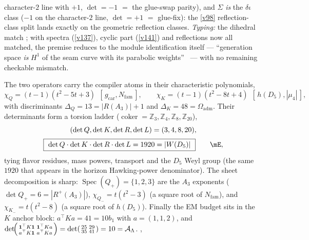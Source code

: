 \documentclass[11pt,a4paper]{article}
\newcommand{\gcar}{g_{\mathrm{car}}}
\newcommand{\Nfam}{N_{\mathrm{fam}}}
\newcommand{\Oadm}{\Omega_{\mathrm{adm}}}
\newcommand{\AL}{\mathcal A_\Lambda}
\newcommand{\Z}{\mathbb{Z}}
\theoremstyle{definition}
\begin{document}
\begin{keybox}
character-$2$ line with $+1$, $\det=-1$ $=$ the glue-swap parity), and $\Sigma$ \emph{is} the
$\delta\iota$ class ($-1$ on the character-$2$ line, $\det=+1$ $=$ glue-fix): the \vref{v98}
reflection-class split lands exactly on the geometric reflection classes. \emph{Typing:} the dihedral
match \mE; with spectra (\vref{v137}), cyclic part (\vref{v141}) and reflections now all matched, the
premise reduces to the module identification itself --- ``generation space \emph{is} $H^1$ of the seam
curve with its parabolic weights'' \mC\ --- with no remaining checkable mismatch.
\end{keybox}

\begin{winbox}
The two operators carry the compiler atoms in their characteristic polynomials,
\begin{equation}
  \chi_Q=(t-1)(t^2-5t+3)\ \ [\,\gcar,\Nfam\,],\qquad
  \chi_K=(t-1)(t^2-8t+4)\ \ [\,h(D_5),|\mu_4|\,],
\end{equation}
with discriminants $\Delta_Q=13=|R(A_3)|{+}1$ and $\Delta_K=48=\Oadm$. Their determinants form a torsion
ladder ($\operatorname{coker}=\Z_3,\Z_4,\Z_8,\Z_{20}$),
\begin{equation}
\begin{gathered}
  (\det Q,\det K,\det R,\det L)=(3,4,8,20),\\[2pt]
  \boxed{\ \det Q\cdot\det K\cdot\det R\cdot\det L=1920=|W(D_5)|\ }\qquad\mE ,
\end{gathered}
\end{equation}
tying flavor residues, mass powers, transport and the $D_5$ Weyl group (the same $1920$ that appears in the
horizon Hawking-power denominator). The sheet decomposition is sharp: $\operatorname{Spec}(Q_+)=\{1,2,3\}$
are the $A_3$ exponents ($\det Q_+=6=|R^+(A_3)|$), $\chi_{Q_-}=t(t^2-3)$ (a square root of $\Nfam$), and
$\chi_{K_-}=t(t^2-8)$ (a square root of $h(D_5)$). Finally the EM budget sits in the $K$ anchor block:
$a^\top K a=41=10b_1$ with $a=(1,1,2)$, and $\det\!\begin{psmallmatrix}\mathbf1^\top K\mathbf1&\mathbf1^\top Ka\\ a^\top K\mathbf1&a^\top Ka\end{psmallmatrix}=\det\begin{psmallmatrix}25&29\\35&41\end{psmallmatrix}=10=\AL$.
, 
\smallskip\\

\end{winbox}
\end{document}
